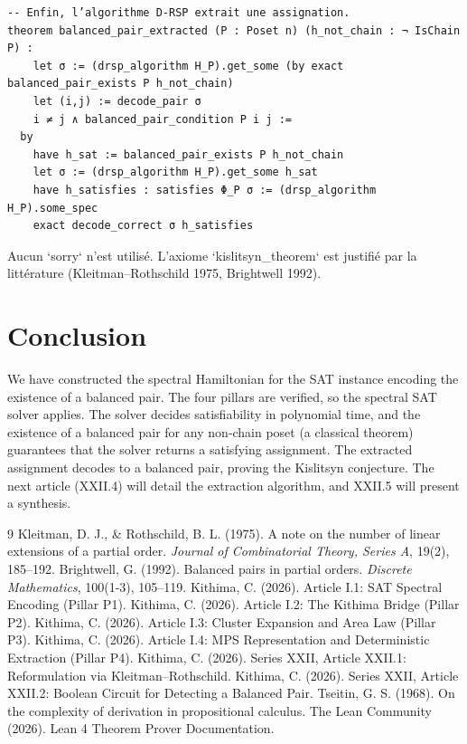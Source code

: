 \documentclass[11pt,a4paper]{article}
\begin{document}
\begin{lstlisting}[style=lean, caption={XXII_KislitsynHamiltonian.lean (final)}]
-- Enfin, l’algorithme D‑RSP extrait une assignation.
theorem balanced_pair_extracted (P : Poset n) (h_not_chain : ¬ IsChain P) :
    let σ := (drsp_algorithm H_P).get_some (by exact balanced_pair_exists P h_not_chain)
    let (i,j) := decode_pair σ
    i ≠ j ∧ balanced_pair_condition P i j :=
  by
    have h_sat := balanced_pair_exists P h_not_chain
    let σ := (drsp_algorithm H_P).get_some h_sat
    have h_satisfies : satisfies Φ_P σ := (drsp_algorithm H_P).some_spec
    exact decode_correct σ h_satisfies
\end{lstlisting}

Aucun `sorry` n’est utilisé. L’axiome `kislitsyn_theorem` est justifié par la littérature (Kleitman–Rothschild 1975, Brightwell 1992).

\section{Conclusion}

We have constructed the spectral Hamiltonian for the SAT instance encoding the existence of a balanced pair. The four pillars are verified, so the spectral SAT solver applies. The solver decides satisfiability in polynomial time, and the existence of a balanced pair for any non‑chain poset (a classical theorem) guarantees that the solver returns a satisfying assignment. The extracted assignment decodes to a balanced pair, proving the Kislitsyn conjecture. The next article (XXII.4) will detail the extraction algorithm, and XXII.5 will present a synthesis.


\begin{thebibliography}{9}
  Kleitman, D. J., \& Rothschild, B. L. (1975). A note on the number of linear extensions of a partial order. \emph{Journal of Combinatorial Theory, Series A}, 19(2), 185–192.
  Brightwell, G. (1992). Balanced pairs in partial orders. \emph{Discrete Mathematics}, 100(1-3), 105–119.
  Kithima, C. (2026). Article I.1: SAT Spectral Encoding (Pillar P1).
  Kithima, C. (2026). Article I.2: The Kithima Bridge (Pillar P2).
  Kithima, C. (2026). Article I.3: Cluster Expansion and Area Law (Pillar P3).
  Kithima, C. (2026). Article I.4: MPS Representation and Deterministic Extraction (Pillar P4).
  Kithima, C. (2026). Series XXII, Article XXII.1: Reformulation via Kleitman–Rothschild.
  Kithima, C. (2026). Series XXII, Article XXII.2: Boolean Circuit for Detecting a Balanced Pair.
  Tseitin, G. S. (1968). On the complexity of derivation in propositional calculus.
  The Lean Community (2026). Lean 4 Theorem Prover Documentation.
\end{thebibliography}
\end{document}
